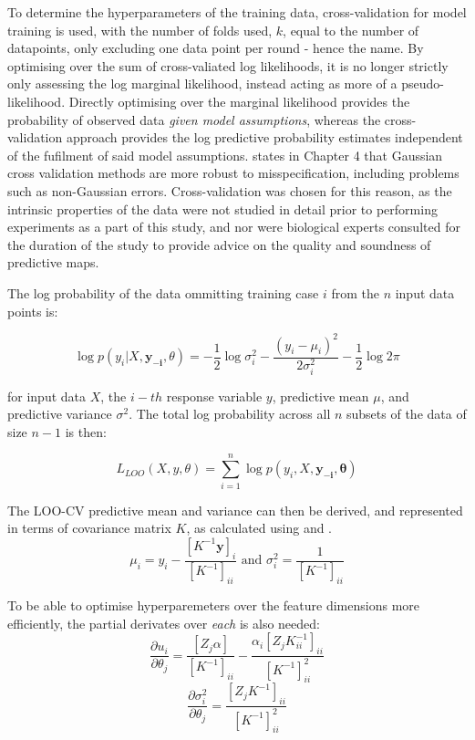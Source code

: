 To determine the hyperparameters of the training data, cross-validation for model training is used, with the number of folds used, $k$, equal to the number of datapoints, only excluding one data point per round - hence the name. By optimising over the sum of cross-valiated log likelihoods, it is no longer strictly only assessing the log marginal likelihood, instead acting as more of a pseudo-likelihood. Directly optimising over the marginal likelihood provides the probability of observed data \textit{given model assumptions}, whereas the cross-validation approach provides the log predictive probability estimates independent of the fufilment of said model assumptions. \citep{wahba90} states in Chapter 4 that Gaussian cross validation methods are more robust to misspecification, including problems such as non-Gaussian errors. Cross-validation was chosen for this reason, as the intrinsic properties of the data were not studied in detail prior to performing experiments as a part of this study, and nor were biological experts consulted for the duration of the study to provide advice on the quality and soundness of predictive maps.

The log probability of the data ommitting training case $i$ from the $n$ input data points is:

$$\log p(y_i|X, \mathbf{y_{-i}}, \theta) = -\frac{1}{2}\log\sigma^2_i - \frac{(y_i - \mu_i)^2}{2 \sigma^2_i} - \frac{1}{2}\log2\pi$$

for input data $X$, the $i-th$ response variable $y$, predictive mean $\mu$, and predictive variance $\sigma^2$. The total log probability across all $n$ subsets of the data of size $n-1$ is then:

$$ L_{LOO}(X, y, \theta) = \sum^n_{i=1} \log p(y_i, X, \mathbf{y_{-i}}, \mathbf{\theta})$$

The LOO-CV predictive mean and variance can then be derived, and represented in terms of covariance matrix $K$, as calculated using  and .
$$\mu_i= y_i - \frac{[K^{-1}\mathbf{y}]_i}{[K^{-1}]_{ii}} \text{ and } \sigma_i^2 = \frac{1}{[K^{-1}]_{ii}}$$

To be able to optimise hyperparemeters over the feature dimensions more efficiently, the partial derivates over \textit{each} is also needed:
$$\frac{\partial{u_i}}{\partial{\theta_j}} = \frac{[Z_j \alpha]}{[K^{-1}]_{ii}} - \frac{\alpha_i[Z_j K^{-1}_{ii}]_{ii}}{[K^{-1}]^2_{ii}}$$
$$\frac{\partial{\sigma_i^2}}{\partial{\theta_j}} = \frac{[Z_jK^{-1}]_{ii}}{[K^{-1}]^2_{ii}}$$

